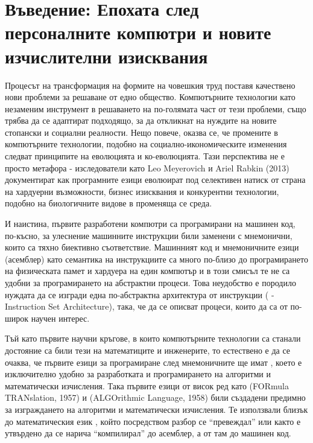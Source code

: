 \section{Въведение: Епохата след персоналните компютри и новите изчислителни изисквания}

Процесът на трансформация на формите на човешкия труд поставя качествено нови проблеми за решаване от едно общество.
Компютърните технологии като незаменим инструмент в решаването на по-голямата част от тези проблеми, също трябва
да се адаптират подходящо, за да откликнат на нуждите на новите стопански и социални реалности.
Нещо повече, оказва се, че промените в компютърните технологии, подобно на социално-икономическите изменения следват
принципите на еволюцията и ко-еволюцията. Тази перспектива не е просто метафора - изследователи като Leo Meyerovich и Ariel Rabkin (2013) документират как програмните езици еволюират под селективен натиск от страна на хардуерни възможности, бизнес изисквания и конкурентни технологии, подобно на биологичните видове в променяща се среда.

И наистина, първите разработени компютри са програмирани на машинен код,
по-късно, за улеснение машинните инструкции били заменени с мнемонични, които са тяхно биективно съответствие.
Машинният код и мнемоничните езици (асемблер) като семантика на инструкциите са много по-близо до програмирането на
физическата памет и хардуера на един компютър и в този смисъл те не са удобни за програмирането на абстрактни процеси.
Това неудобство е породило нуждата да се изгради една по-абстрактна архитектура от инструкции ( - Instruction Set Architecture), така, че
да се описват процеси, които да са от по-широк научен интерес.

Тъй като първите научни кръгове, в които компютърните
технологии са станали достояние са били тези на математиците и инженерите, то естествено е да се очаква, че първите
езици за програмиране след мнемоничните ще имат , което е изключително удобно за разработката и програмирането на
алгоритми и математически изчисления. Така първите езици от висок ред като  (FORmula TRANslation, 1957) и  (ALGOrithmic Language, 1958) били създадени предимно
за изграждането на алгоритми и математически изчисления. Те използвали близък до математическия език , който
посредством разбор се ``превеждал'' или както е утвърдено да се нарича ``компилирал'' до асемблер, а от там до машинен код.

